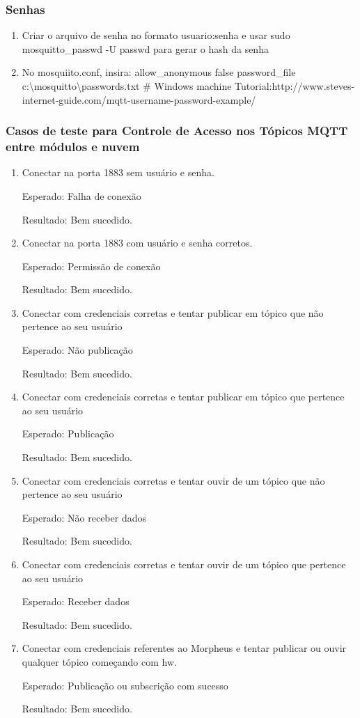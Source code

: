 \subsubsection{Senhas}
\begin{enumerate}
\item Criar o arquivo de senha no formato usuario:senha e usar sudo mosquitto\_passwd -U passwd para gerar o hash da senha
\item No mosquiito.conf, insira:
allow\_anonymous false
password\_file c:\textbackslash mosquitto\textbackslash passwords.txt \# Windows machine
Tutorial:http://www.steves-internet-guide.com/mqtt-username-password-example/
\end{enumerate}


\subsubsection{Casos de teste para Controle de Acesso nos Tópicos MQTT entre módulos e nuvem}
\begin{enumerate}
\item
Conectar na porta 1883 sem usuário e senha.

Esperado: Falha de conexão

Resultado: Bem sucedido.
\item Conectar na porta 1883 com usuário e senha corretos.

Esperado: Permissão de conexão

Resultado: Bem sucedido.
\item
Conectar com credenciais corretas e tentar publicar em tópico que não pertence ao seu usuário

Esperado: Não publicação

Resultado: Bem sucedido.
\item
Conectar com credenciais corretas e tentar publicar em tópico que pertence ao seu usuário

Esperado: Publicação

Resultado: Bem sucedido.
\item
Conectar com credenciais corretas e tentar ouvir de um tópico que não pertence ao seu usuário

Esperado: Não receber dados

Resultado: Bem sucedido.
\item
Conectar com credenciais corretas e tentar ouvir de um tópico que pertence ao seu usuário

Esperado: Receber dados

Resultado: Bem sucedido.

\item
Conectar com credenciais referentes ao Morpheus e tentar publicar ou ouvir qualquer tópico começando com hw.

Esperado: Publicação ou subscrição com sucesso

Resultado: Bem sucedido.
\end{enumerate}

